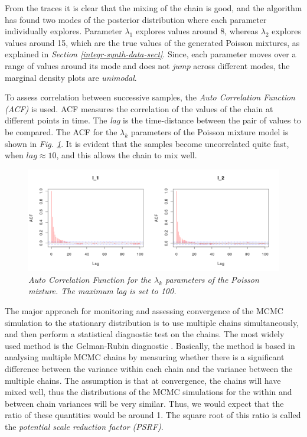 From the traces it is clear that the mixing of the chain is good, and the algorithm has found two modes of the posterior distribution where each parameter individually explores. Parameter $\lambda_{1}$ explores values around 8, whereas $\lambda_{2}$ explores values around 15, which are the true values of the generated Poisson mixtures, as explained in \emph{Section \ref{integr-synth-data-sect}}. Since, each parameter moves over a range of values around its mode and does not \emph{jump} across different modes, the marginal density plots are \emph{unimodal}.

To assess correlation between successive samples, the \emph{Auto Correlation Function (ACF)} is used. ACF measures the correlation of the values of the chain at different points in time. The \emph{lag} is the time-distance between the pair of values to be compared. The ACF for the $\lambda_{k}$ parameters of the Poisson mixture model is shown in \emph{Fig. \ref{acfL-pic}}. It is evident that the samples become uncorrelated quite fast, when $lag \approx 10$, and this allows the chain to mix well.
\begin{figure}[!ht]
\begin{center}
 \includegraphics[scale = 0.4]{images/acfL.png}
\caption{\emph{Auto Correlation Function for the $\lambda_{k}$ parameters of the Poisson mixture. The maximum lag is set to 100.}}
\label{acfL-pic}
\end{center}
\end{figure}

The major approach for monitoring and assessing convergence of the MCMC simulation to the stationary distribution is to use multiple chains simultaneously, and then perform a statistical diagnostic test on the chains. The most widely used method is the Gelman-Rubin diagnostic \citep{Gelman1992, Brooks1997}. Basically, the method is based in analysing multiple MCMC chains by measuring whether there is a significant difference between the variance within each chain and the variance between the multiple chains. The assumption is that at convergence, the chains will have mixed well, thus the distributions of the MCMC simulations for the within and between chain variances will be very similar. Thus, we would expect that the ratio of these quantities would be around 1. The square root of this ratio is called the \emph{potential scale reduction factor (PSRF)}. 


